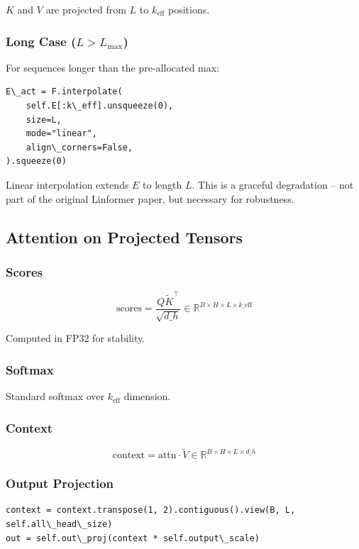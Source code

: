 $K$ and $V$ are projected from $L$ to $k_\text{eff}$ positions.

\subsubsection{Long Case ($L > L_\text{max}$)}

For sequences longer than the pre-allocated max:

\begin{lstlisting}
E\_act = F.interpolate(
    self.E[:k\_eff].unsqueeze(0),
    size=L,
    mode="linear",
    align\_corners=False,
).squeeze(0)
\end{lstlisting}

Linear interpolation extends $E$ to length $L$. This is a graceful 
degradation -- not part of the original Linformer paper, but necessary for 
robustness.

\subsection{Attention on Projected Tensors}

\subsubsection{Scores}

\[
\text{scores} = \frac{Q \tilde{K}^\top}{\sqrt{d\_h}} \in \mathbb{R}^{B \times H \times L \times k\_\text{eff}}
\tag{4.1}
\]

Computed in FP32 for stability.

\subsubsection{Softmax}

Standard softmax over $k_\text{eff}$ dimension.

\subsubsection{Context}

\[
\text{context} = \text{attn} \cdot \tilde{V} \in \mathbb{R}^{B \times H \times L \times d\_h}
\tag{4.2}
\]

\subsubsection{Output Projection}

\begin{lstlisting}
context = context.transpose(1, 2).contiguous().view(B, L, self.all\_head\_size)
out = self.out\_proj(context * self.output\_scale)
\end{lstlisting}

